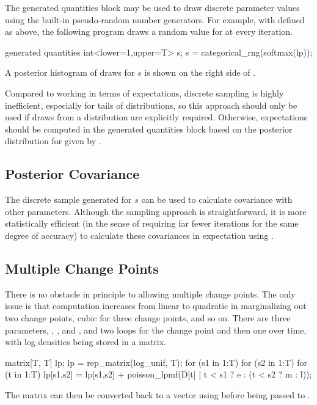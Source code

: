 The generated quantities block may be used to draw discrete parameter
values using the built-in pseudo-random number generators.  For
example, with  defined as above, the following program
draws a random value for  at every iteration.
%
\begin{stancode}
generated quantities {
  int<lower=1,upper=T> s;
  s = categorical_rng(softmax(lp));
}
\end{stancode}
%
A posterior histogram of draws for $s$ is shown on the right side of
.

Compared to working in terms of expectations, discrete sampling is
highly inefficient, especially for tails of distributions, so this
approach should only be used if draws from a distribution are
explicitly required.   Otherwise, expectations should be computed in
the generated quantities block based on the posterior distribution for
 given by .


\subsection{Posterior Covariance}

The discrete sample generated for $s$ can be used to calculate
covariance with other parameters.  Although the sampling approach is
straightforward, it is more statistically efficient (in the sense of
requiring far fewer iterations for the same degree of accuracy) to
calculate these covariances in expectation using .


\subsection{Multiple Change Points}

There is no obstacle in principle to allowing multiple change points.
The only issue is that computation increases from linear to quadratic
in marginalizing out two change points, cubic for three change points,
and so on.  There are three parameters, , , and
, and two loops for the change point and then one over time,
with log densities being stored in a matrix.
%
\begin{stancode}
matrix[T, T] lp;
lp = rep_matrix(log_unif, T);
for (s1 in 1:T)
  for (s2 in 1:T)
    for (t in 1:T)
      lp[s1,s2] = lp[s1,s2] 
        + poisson_lpmf(D[t] | t < s1 ? e : (t < s2 ? m : l));
\end{stancode}
%
The matrix can then be converted back to a vector using
 before being passed to .

